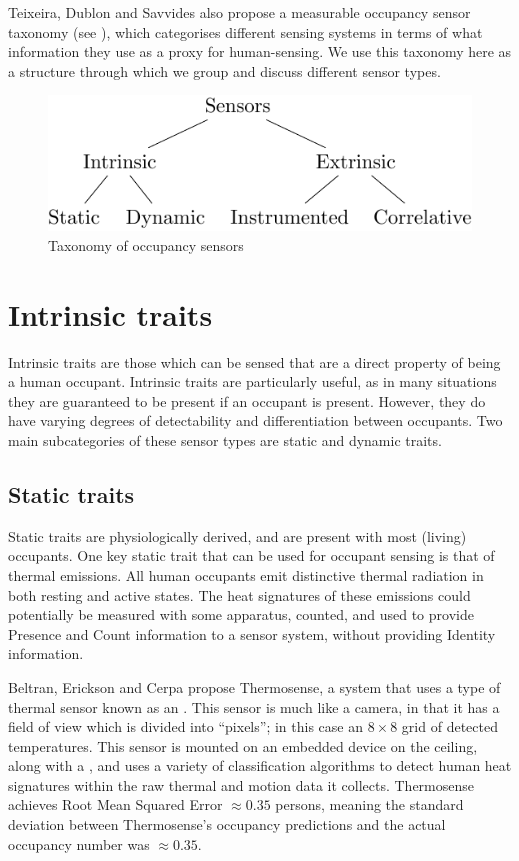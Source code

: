 \documentclass[../thesis/thesis.tex]{subfiles}
\begin{document}
Teixeira, Dublon and Savvides \cite{teixeira2010survey} also propose a measurable occupancy sensor taxonomy (see ), which categorises different sensing systems in terms of what information they use as a proxy for human-sensing. We use this taxonomy here as a structure through which we group and discuss different sensor types.

\begin{figure}
\centering
\includegraphics{../diagrams/category-tree.pdf}
\caption{Taxonomy of occupancy sensors}
\label{fig:litreview:taxonomy}
\end{figure}

\section{Intrinsic traits}
\label{subsec:litreview:sensors:intrinsic}

Intrinsic traits are those which can be sensed that are a direct property of being a human occupant. Intrinsic traits are particularly useful, as in many situations they are guaranteed to be present if an occupant is present. However, they do have varying degrees of detectability and differentiation between occupants. Two main subcategories of these sensor types are static and dynamic traits.

\subsection{Static traits}
\label{subsubsec:litreview:sensors:intrinsic:static}
Static traits are physiologically derived, and are present with most (living) occupants. One key static trait that can be used for occupant sensing is that of thermal emissions. All human occupants emit distinctive thermal radiation in both resting and active states. The heat signatures of these emissions could potentially be measured with some apparatus, counted, and used to provide Presence and Count information to a sensor system, without providing Identity information.

Beltran, Erickson and Cerpa \cite{beltran2013thermosense} propose Thermosense, a system that uses a type of thermal sensor known as an \iar. This sensor is much like a camera, in that it has a field of view which is divided into ``pixels''; in this case an $8\times8$ grid of detected temperatures. This sensor is mounted on an embedded device on the ceiling, along with a \pir, and uses a variety of classification algorithms to detect human heat signatures within the raw thermal and motion data it collects. Thermosense achieves Root Mean Squared Error $\approx0.35$ persons, meaning the standard deviation between Thermosense's occupancy predictions and the actual occupancy number was $\approx0.35$.
\end{document}
